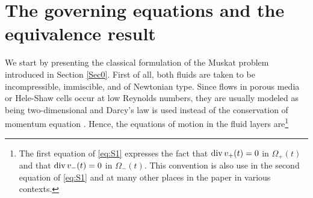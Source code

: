 \documentclass[11pt,reqno]{amsart}
\numberwithin{equation}{section}
\newcommand{\0}{\Omega}
\numberwithin{equation}{section}
\begin{document}
\section{The governing equations and the equivalence result}\label{Sec1}
We start by presenting the classical formulation of the Muskat problem introduced  in Section \ref{Sec0}.
First of all, both fluids are taken to be incompressible, immiscible, and of Newtonian type. 
Since  flows in porous media or Hele-Shaw cells occur at low Reynolds numbers, they are usually modeled as being two-dimensional and  Darcy's law is used instead of the conservation of momentum equation \cite{Be88}.
Hence, the equations  of motion in the fluid layers are\footnote{The first equation of \eqref{eq:S1} expresses the fact that ${\rm div}\,  v_+(t)=0$ in $ \Omega_+(t)$ and that ${\rm div}\,  v_-(t)=0$ in $ \Omega_-(t).$
This convention is also use in the second equation of \eqref{eq:S1} and at many other places in the paper in various contexts.}
\end{document}
